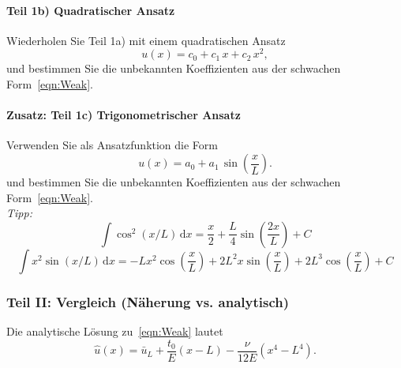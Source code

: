 \documentclass[12pt, a4paper]{article}              %
\begin{document}
\paragraph{Teil 1b) Quadratischer Ansatz}
Wiederholen Sie Teil 1a) mit einem quadratischen Ansatz
\begin{equation}\label{eqn:TrialQuad}
  u(x) = c_0 + c_1\,x + c_2\,x^2,
\end{equation}
und bestimmen Sie die unbekannten Koeffizienten aus der schwachen Form~\eqref{eqn:Weak}. %


\paragraph{Zusatz: Teil 1c) Trigonometrischer Ansatz}
Verwenden Sie als Ansatzfunktion die Form
\begin{equation}\label{eqn:TrialSin}
  u(x) = a_0 + a_1\,\sin\!\left(\frac{x}{L}\right).
\end{equation}
und bestimmen Sie die unbekannten Koeffizienten aus der schwachen Form~\eqref{eqn:Weak}. %
\\

\emph{Tipp:}
\begin{equation}
\int \cos^2(x/L)\,\mathrm{d}x=\frac{x}{2}+\frac{L}{4}\sin\!\left(\frac{2x}{L}\right)+C
\end{equation}
\begin{equation}
\int x^2\sin(x/L)\,\mathrm{d}x=-Lx^2\cos\!\left(\frac{x}{L}\right)+2L^2x\sin\!\left(\frac{x}{L}\right)+2L^3\cos\!\left(\frac{x}{L}\right)+C
\end{equation}




\newpage
\subsubsection*{Teil II: Vergleich (Näherung vs. analytisch)}
Die analytische Lösung zu~\eqref{eqn:Weak} lautet
  \begin{equation}\label{eqn:Solution}
    \hat{u}(x) = \bar{u}_L + \frac{t_0}{E}(x - L) - \frac{\nu}{12 E}(x^4 - L^4).
  \end{equation}
\end{document}
